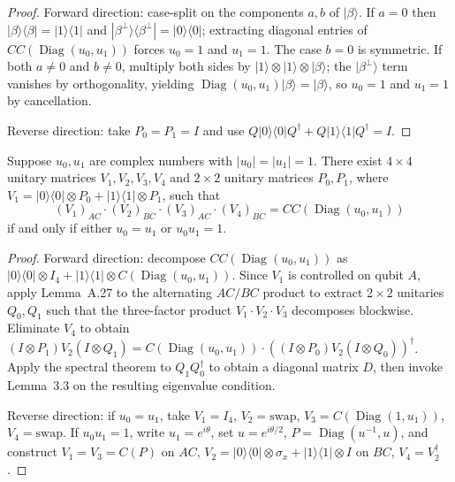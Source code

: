 \begin{proof}
  \leanok
  Forward direction: case-split on the components $a, b$ of $|\beta\rangle$.
  If $a = 0$ then $|\beta\rangle\langle\beta| = |1\rangle\langle 1|$ and
  $|\beta^\perp\rangle\langle\beta^\perp| = |0\rangle\langle 0|$;
  extracting diagonal entries of $CC(\operatorname{Diag}(u_0, u_1))$ forces $u_0 = 1$ and $u_1 = 1$.
  The case $b = 0$ is symmetric.
  If both $a \neq 0$ and $b \neq 0$, multiply both sides by $|1\rangle \otimes |1\rangle \otimes |\beta\rangle$;
  the $|\beta^\perp\rangle$ term vanishes by orthogonality, yielding
  $\operatorname{Diag}(u_0, u_1)|\beta\rangle = |\beta\rangle$,
  so $u_0 = 1$ and $u_1 = 1$ by cancellation.

  Reverse direction: take $P_0 = P_1 = I$ and use $Q|0\rangle\langle 0|Q^\dagger + Q|1\rangle\langle 1|Q^\dagger = I$.
\end{proof}

\begin{lemma}
  \label{lem:s4_3}
  \leanok
  Suppose $u_0, u_1$ are complex numbers with $|u_0| = |u_1| = 1$.
  There exist $4 \times 4$ unitary matrices $V_1, V_2, V_3, V_4$ and
  $2 \times 2$ unitary matrices $P_0, P_1$, where
  $V_1 = |0\rangle\langle 0| \otimes P_0 + |1\rangle\langle 1| \otimes P_1$,
  such that
  \[
    (V_1)_{AC} \cdot (V_2)_{BC} \cdot (V_3)_{AC} \cdot (V_4)_{BC}
    = CC(\operatorname{Diag}(u_0, u_1))
  \]
  if and only if either $u_0 = u_1$ or $u_0 u_1 = 1$.
\end{lemma}

\begin{proof}
  \leanok
  Forward direction: decompose $CC(\operatorname{Diag}(u_0, u_1))$ as
  $|0\rangle\langle 0| \otimes I_4 + |1\rangle\langle 1| \otimes C(\operatorname{Diag}(u_0, u_1))$.
  Since $V_1$ is controlled on qubit $A$, apply Lemma~A.27 to the alternating $AC/BC$ product
  to extract $2 \times 2$ unitaries $Q_0, Q_1$ such that the three-factor product
  $V_1 \cdot V_2 \cdot V_3$ decomposes blockwise.
  Eliminate $V_4$ to obtain
  $(I \otimes P_1) V_2 (I \otimes Q_1) = C(\operatorname{Diag}(u_0, u_1)) \cdot ((I \otimes P_0) V_2 (I \otimes Q_0))^\dagger$.
  Apply the spectral theorem to $Q_1 Q_0^\dagger$ to obtain a diagonal matrix $D$, then
  invoke Lemma~3.3 on the resulting eigenvalue condition.

  Reverse direction: if $u_0 = u_1$, take $V_1 = I_4$, $V_2 = \text{swap}$,
  $V_3 = C(\operatorname{Diag}(1, u_1))$, $V_4 = \text{swap}$.
  If $u_0 u_1 = 1$, write $u_1 = e^{i\theta}$, set $u = e^{i\theta/2}$,
  $P = \operatorname{Diag}(u^{-1}, u)$, and construct
  $V_1 = V_3 = C(P)$ on $AC$,
  $V_2 = |0\rangle\langle 0| \otimes \sigma_x + |1\rangle\langle 1| \otimes I$ on $BC$,
  $V_4 = V_2^\dagger$.
\end{proof}

